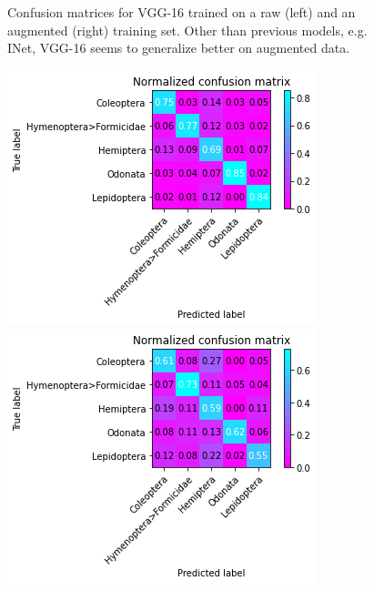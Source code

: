 \begin{figure}
\begin{multicols}{2}
\begin{minipage}{.45\textwidth}
        \end{minipage}
    \end{multicols}
    \caption{Confusion matrices for VGG-16 trained on a raw (left) and an augmented (right) training set. Other than previous models, e.g. INet, VGG-16 seems to generalize better on augmented data.}
    \label{fig:classification-vgg-conf}
\end{figure}

\begin{figure}
    \centering
    \begin{multicols}{2}
        \begin{minipage}{.45\textwidth}
         \includegraphics[width=\textwidth]{images/uncropped-inet.png}
        \end{minipage}
        \columnbreak
        \begin{minipage}{.45\textwidth}
           \includegraphics[width=\textwidth]{images/sequential-classification-mobilenet.png}

\end{minipage}
\end{multicols}
\end{figure}
